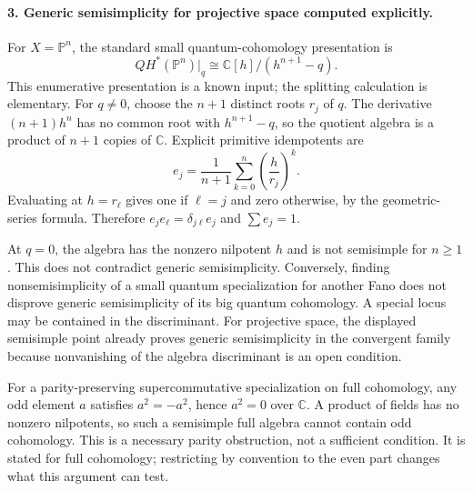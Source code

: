 \documentclass[11pt]{article}
\begin{document}
\paragraph{3. Generic semisimplicity for projective space computed explicitly.}
For $X=\mathbb P^n$, the standard small quantum-cohomology presentation is
\[
 QH^*(\mathbb P^n)\big|_q\cong\mathbb C[h]/(h^{n+1}-q).
\]
This enumerative presentation is a known input; the splitting calculation is elementary. For $q\ne0$, choose the $n+1$ distinct roots $r_j$ of $q$. The derivative $(n+1)h^n$ has no common root with $h^{n+1}-q$, so the quotient algebra is a product of $n+1$ copies of $\mathbb C$. Explicit primitive idempotents are
\[
 e_j=\frac1{n+1}\sum_{k=0}^{n}\left(\frac h{r_j}\right)^k.
\]
Evaluating at $h=r_\ell$ gives one if $\ell=j$ and zero otherwise, by the geometric-series formula. Therefore $e_je_\ell=\delta_{j\ell}e_j$ and $\sum e_j=1$.

At $q=0$, the algebra has the nonzero nilpotent $h$ and is not semisimple for $n\geq1$. This does not contradict generic semisimplicity. Conversely, finding nonsemisimplicity of a small quantum specialization for another Fano does not disprove generic semisimplicity of its big quantum cohomology. A special locus may be contained in the discriminant. For projective space, the displayed semisimple point already proves generic semisimplicity in the convergent family because nonvanishing of the algebra discriminant is an open condition.

For a parity-preserving supercommutative specialization on full cohomology, any odd element $a$ satisfies $a^2=-a^2$, hence $a^2=0$ over $\mathbb C$. A product of fields has no nonzero nilpotents, so such a semisimple full algebra cannot contain odd cohomology. This is a necessary parity obstruction, not a sufficient condition. It is stated for full cohomology; restricting by convention to the even part changes what this argument can test.
\end{document}
